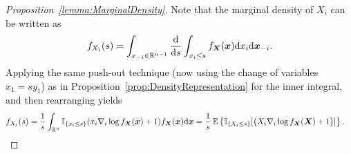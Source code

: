 \begin{subappendices}
\begin{proof}[Proposition~\ref{lemma:MarginalDensity}]
Note that the marginal density of $X_i$ can be written as
 \[ f_{X_i}(s)
    =\int_{x_{-i} \in \mathbb{R}^{n-1}} \frac{\mathrm{d}}{\mathrm{d} s}  \int_{x_i \le s} f_{\boldsymbol{X}}(\boldsymbol{x}) \mathrm{d} x_i \mathrm{d} \boldsymbol{x}_{-i}.
 \]
 Applying the same push-out technique (now using the change of variables $x_1 = s y_1$) as in Proposition~\ref{prop:DensityRepresentation} for the inner integral, and then rearranging yields
 \begin{align*}
    f_{X_i}(s)
    &=\frac1s \int_{\mathbb{R}^{n}} \mathbb{I}_{\{x_i \le s \}} (x_i \nabla_i \log f_{\boldsymbol{X}}(\boldsymbol{x}) + 1 )  f_{\boldsymbol{X}}(\boldsymbol{x}) \mathrm{d} \boldsymbol{x} 
    = \frac1s \operatorname{{\mathbb E}} \big\{ \mathbb{I}_{\{ X_i \le s \}} [ \big(X_i \nabla_i \log f_{\boldsymbol{X}}(\boldsymbol{X}) + 1 \big) ] \big\} \,.
    \end{align*}

\end{proof}



\end{subappendices}